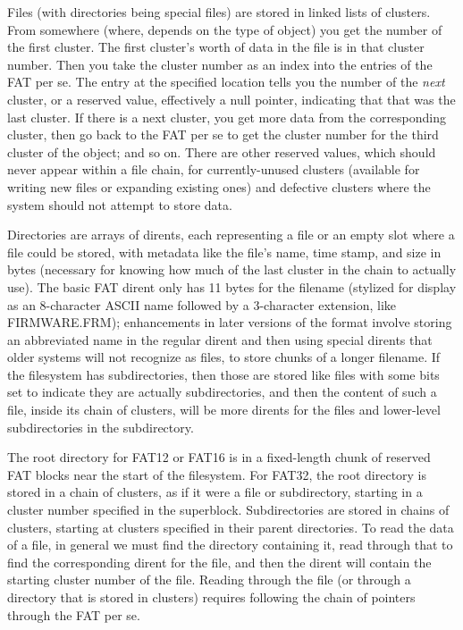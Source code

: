 Files (with directories being special files) are stored in linked lists of
clusters.  From somewhere (where, depends on the type of object) you get the
number of the first cluster.  The first cluster's worth of data in the file
is in that cluster number.  Then you take the cluster number as an index
into the entries of the FAT per se.  The entry at the specified location
tells you the number of the \emph{next} cluster, or a reserved value,
effectively a null pointer, indicating that that was the last cluster.  If
there is a next cluster, you get more data from the corresponding cluster,
then go back to the FAT per se to get the cluster number for the third
cluster of the object; and so on.  There are other reserved values, which
should never appear within a file chain, for currently-unused clusters
(available for writing new files or expanding existing ones) and defective
clusters where the system should not attempt to store data.

Directories are arrays of dirents, each representing a file or an empty slot
where a file could be stored, with metadata like the file's name, time
stamp, and size in bytes (necessary for knowing how much of the last cluster
in the chain to actually use).  The basic FAT dirent only has 11 bytes for
the filename (stylized for display as an 8-character ASCII name followed by
a 3-character extension, like FIRMWARE.FRM); enhancements in later
versions of the format involve storing an abbreviated name in the regular
dirent and then using special dirents that older systems will not recognize
as files, to store chunks of a longer filename.  If the filesystem has
subdirectories, then those are stored like files with some bits set to
indicate they are actually subdirectories, and then the content of such a
file, inside its chain of clusters, will be more dirents for the files and
lower-level subdirectories in the subdirectory.

The root directory for FAT12 or FAT16 is in a fixed-length chunk of reserved
FAT blocks near the start of the filesystem.  For FAT32, the root directory
is stored in a chain of clusters, as if it were a file or subdirectory,
starting in a cluster number specified in the superblock.  Subdirectories
are stored in chains of clusters, starting at clusters specified in their
parent directories.  To read the data of a file, in general we must find the
directory containing it, read through that to find the corresponding dirent
for the file, and then the dirent will contain the starting cluster number
of the file.  Reading through the file (or through a directory that is
stored in clusters) requires following the chain of pointers through the FAT
per se.

